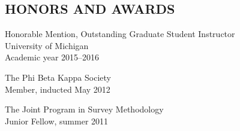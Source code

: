 \documentclass[line]{res}
\begin{document}
\begin{resume}
\section{HONORS AND AWARDS}          
Honorable Mention, Outstanding Graduate Student Instructor\\
University of Michigan\\
Academic year 2015--2016

The Phi Beta Kappa Society\\
Member, inducted May 2012

The Joint Program in Survey Methodology\\
Junior Fellow, summer 2011

\end{resume}
\end{document}
